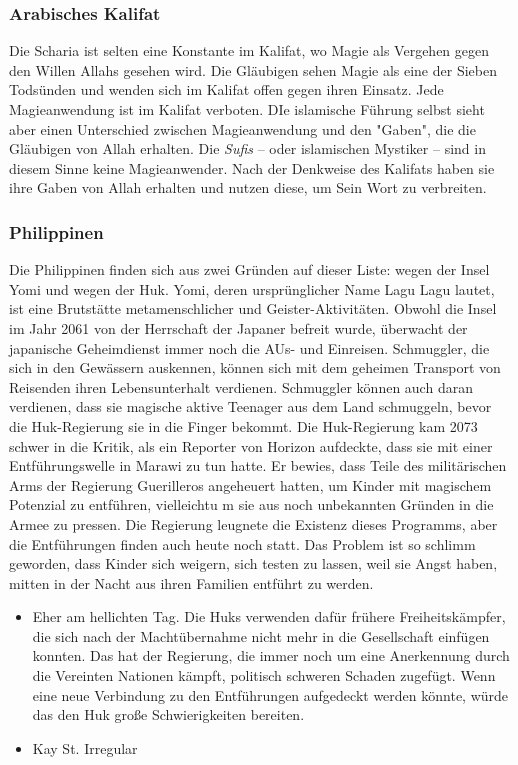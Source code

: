 \documentclass[a4paper, 10pt, twocolumn, twoside]{book}
\newenvironment{dckcomment}[1]
    {
    \def\commentauthor{#1}
    \setmainfont{Decker}
    \small
	\par    
    \begin{itemize}[leftmargin=1.2em, itemsep=-1ex, label={
    \begin{tcolorbox}[valign=center, halign=center,hbox,boxsep=-3.7mm, boxrule=0mm,colback=black, square, circular arc]  
    {\color{normalpage}\bfseries\textgreater}
	\end{tcolorbox}    
	}]
    \item  
    }
    {    
	\item \commentauthor 
    \end{itemize}
    \par
    }
\begin{document}
\subsubsection{Arabisches Kalifat}
Die Scharia ist selten eine Konstante im Kalifat, wo Magie als Vergehen gegen den Willen Allahs gesehen wird. Die Gläubigen sehen Magie als eine der Sieben Todsünden und wenden sich im Kalifat offen gegen ihren Einsatz. Jede Magieanwendung ist im Kalifat verboten. DIe islamische Führung selbst sieht aber einen Unterschied zwischen Magieanwendung und den "Gaben", die die Gläubigen von Allah erhalten. Die \emph{Sufis} -- oder islamischen Mystiker -- sind in diesem Sinne keine Magieanwender. Nach der Denkweise des Kalifats haben sie ihre Gaben von Allah erhalten und nutzen diese, um Sein Wort zu verbreiten.

\subsubsection{Philippinen}
Die Philippinen finden sich aus zwei Gründen auf dieser Liste: wegen der Insel Yomi und wegen der Huk. Yomi, deren ursprünglicher Name Lagu Lagu lautet, ist eine Brutstätte metamenschlicher und Geister-Aktivitäten. Obwohl die Insel im Jahr 2061 von der Herrschaft der Japaner befreit wurde, überwacht der japanische Geheimdienst immer noch die AUs- und Einreisen. Schmuggler, die sich in den Gewässern auskennen, können sich mit dem geheimen Transport von Reisenden ihren Lebensunterhalt verdienen. Schmuggler können auch daran verdienen, dass sie magische aktive Teenager aus dem Land schmuggeln, bevor die Huk-Regierung sie in die Finger bekommt. Die Huk-Regierung kam 2073 schwer in die Kritik, als ein Reporter von Horizon aufdeckte, dass sie mit einer Entführungswelle in Marawi zu tun hatte. Er bewies, dass Teile des militärischen Arms der Regierung Guerilleros angeheuert hatten, um Kinder mit magischem Potenzial zu entführen, vielleichtu m sie aus noch unbekannten Gründen in die Armee zu pressen. Die Regierung leugnete die Existenz dieses Programms, aber die Entführungen finden auch heute noch statt. Das Problem ist so schlimm geworden, dass Kinder sich weigern, sich testen zu lassen, weil sie Angst haben, mitten in der Nacht aus ihren Familien entführt zu werden.
\begin{dckcomment}{Kay St. Irregular}
Eher am hellichten Tag. Die Huks verwenden dafür frühere Freiheitskämpfer, die sich nach der Machtübernahme nicht mehr in die Gesellschaft einfügen konnten. Das hat der Regierung, die immer noch um eine Anerkennung durch die Vereinten Nationen kämpft, politisch schweren Schaden zugefügt. Wenn eine neue Verbindung zu den Entführungen aufgedeckt werden könnte, würde das den Huk große Schwierigkeiten bereiten.
\end{dckcomment}
\end{document}
